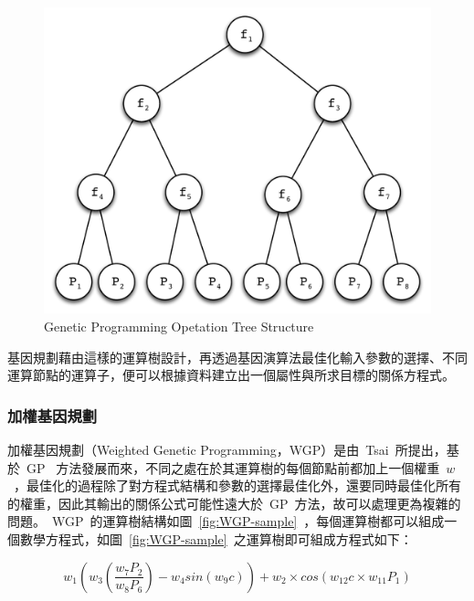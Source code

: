 \begin{figure}[hbtp]
  \begin{center}
    \includegraphics[width=1.0\textwidth]{figures/gp-struct.pdf}
    \caption{Genetic Programming Opetation Tree Structure} 
    \label{fig:GP-struct}
  \end{center}
\end{figure}

基因規劃藉由這樣的運算樹設計，再透過基因演算法最佳化輸入參數的選擇、不同運算節點的運算子，便可以根據資料建立出一個屬性與所求目標的關係方程式。

\subsubsection{加權基因規劃}

加權基因規劃（Weighted Genetic Programming，WGP）是由~Tsai\cite{tsai2011predicting}~所提出，基於~GP~ 方法發展而來，不同之處在於其運算樹的每個節點前都加上一個權重~$w$~，最佳化的過程除了對方程式結構和參數的選擇最佳化外，還要同時最佳化所有的權重，因此其輸出的關係公式可能性遠大於~GP~方法，故可以處理更為複雜的問題。~WGP~的運算樹結構如圖~\ref{fig:WGP-sample}~，每個運算樹都可以組成一個數學方程式，如圖~\ref{fig:WGP-sample}~之運算樹即可組成方程式如下：

\begin{equation} w_1(w_3(\dfrac{w_7P_2}{w_8P_6}) - w_4sin(w_9c))+w_2 \times cos(w_{12}c \times w_{11}P_1) \label{eq:WGP-sample}\end{equation} 


